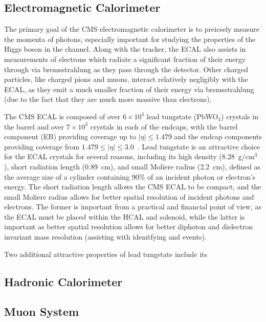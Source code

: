 \subsection{Electromagnetic Calorimeter} \label{sec:cms_ecal}
The primary goal of the CMS electromagnetic calorimeter is to preicsely measure the momenta of photons, especially important for studying the properties of the Higgs boson in the \Hgg channel.
Along with the tracker, the ECAL also assists in measurements of electrons which radiate a significant fraction of their energy through via bremsstrahlung as they pass through the detector.
Other charged particles, like charged pions and muons, interact relatively negligibly with the ECAL, as they emit a much smaller fraction of their energy via bremsstrahlung (due to the fact that they are much more massive than electrons).

The CMS ECAL is composed of over $6 \times 10^4$ lead tungstate (PbWO$_4$) crystals in the barrel and over $7 \times 10^3$ crystals in each of the endcaps, with the barrel component (EB) providing coverage up to $|\eta| \leq 1.479$ and the endcap components providing coverage from $1.479 \leq |\eta| \leq 3.0$~\cite{Chatrchyan:2008aa}.
Lead tungstate is an attractive choice for the ECAL crystals for several reasons, including its high density (8.28~g/cm$^3$), short radiation length (0.89~cm), and small Moliere radius (2.2~cm), defined as the average size of a cylinder containing 90\% of an incident photon or electron's energy.
The short radiation length allows the CMS ECAL to be compact, and the small Moliere radius allows for better spatial resolution of incident photons and electrons.
The former is important from a practical and financial point of view, as the ECAL must be placed within the HCAL and solenoid, while the latter is important as better spatial resolution allows for better diphoton and dielectron invariant mass resolution (assisting with idenitfying \Hgg and \Zee events).

Two additional attractive properties of lead tungstate include its 
\subsection{Hadronic Calorimeter} \label{sec:cms_hcal}

\subsection{Muon System} \label{sec:cms_muon_system}

